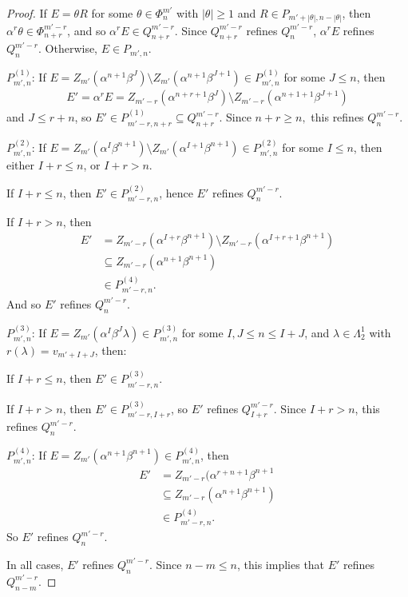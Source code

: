 \documentclass[12pt]{amsart}
\newcommand{\sm}{\setminus}
\newcommand{\sse}{\subseteq}
\newcommand{\al}{\alpha}
\newcommand{\be}{\beta}
\renewcommand{\th}{\theta}
\newcommand{\la}{\lambda}
\newcommand{\La}{\Lambda}
\theoremstyle{plain} %
\theoremstyle{definition} %
\begin{document}
\begin{proof}
    If $E = \th R$ for some $\th \in \Phi_n^{m'}$ with $|\th| \geq 1$ and $R \in P_{m'+|\th|, n-|\th|}$, then $\al^r \th \in \Phi_{n+r}^{m'-r}$, and so $\al^rE \in Q_{n+r}^{m'-r}$. Since $Q_{n+r}^{m'-r}$ refines $Q_{n}^{m'-r}$, $\al^rE$ refines $Q_{n}^{m'-r}$.
    Otherwise, $E \in P_{m',n}$.

$P^{(1)}_{m',n}$:
If $E =Z_{m'}(\al^{n+1}\be^J)\sm Z_{m'}(\al^{n+1}\be^{J+1}) \in P^{(1)}_{m',n}$ for some $J \leq n$, then 
\begin{align*}
    E' = \al^rE = Z_{m'-r}(\al^{n+r+1}\be^J)\sm Z_{m'-r}(\al^{n+1+1}\be^{J+1})
\end{align*}
and $J \leq r+n$, so $E' \in P^{(1)}_{m'-r, n+r} \sse Q_{n+r}^{m'-r}$. Since $n+r \geq n,$ this refines $Q_{n}^{m'-r}$.

$P^{(2)}_{m',n}$: If $E =Z_{m'}(\al^{I}\be^{n+1})\sm Z_{m'}(\al^{I+1}\be^{n+1}) \in P^{(2)}_{m',n}$ for some $I \leq n$, then either $I+r \leq n$, or $I+r > n$.

If $I+r \leq n$, then $E'\in P^{(2)}_{m'-r, n}$, hence $E'$ refines $Q_n^{m'-r}$.

If $I+r > n$, then 
\begin{align*}
    E' &= Z_{m'-r}(\al^{I+r}\be^{n+1})\sm Z_{m'-r}(\al^{I+r+1}\be^{n+1})\\
    &\sse Z_{m'-r}(\al^{n+1}\be^{n+1})\\
    &\in P_{m'-r, n}^{(4)}.
\end{align*} And so $E'$ refines $Q_n^{m'-r}$.

$P^{(3)}_{m',n}$: If $E =Z_{m'}(\al^{I}\be^{J}\la) \in P^{(3)}_{m',n}$ for some $I, J \leq n \leq I + J$, and $\la \in \La_2^1$ with $r(\la) = v_{m' + I+J}$, then:

If $I+r \leq n$, then $E' \in P_{m'-r,n}^{(3)}$.

If $I+r > n$, then $E' \in P^{(3)}_{m'-r, I+r}$, so $E'$ refines $Q^{m'-r}_{I+r}$. Since $I+r > n$, this refines $Q^{m'-r}_{n}$.

$P^{(4)}_{m',n}$: If $E =Z_{m'}(\al^{n+1}\be^{n+1}) \in P^{(4)}_{m',n}$, then \begin{align*}
    E' &= Z_{m'-r}(\al^{r+n+1}\be^{n+1} \\
    &\sse Z_{m'-r}(\al^{n+1}\be^{n+1}) \\
    &\in P^{(4)}_{m'-r, n}.
\end{align*} So $E'$ refines $Q_n^{m'-r}$.

In all cases, $E'$ refines $Q_{n}^{m'-r}.$ Since $n -m \leq n$, this implies that $E'$ refines $Q_{n-m}^{m'-r}$.
\end{proof}
\end{document}

